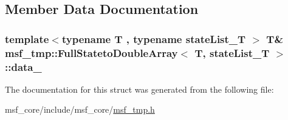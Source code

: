 \subsection{Member Data Documentation}
\hypertarget{structmsf__tmp_1_1FullStatetoDoubleArray_a6fc51890393603ad774e5dde66389be0}{
\subsubsection[{data\-\_\-}]{\setlength{\rightskip}{0pt plus 5cm}template$<$typename T , typename state\-List\-\_\-\-T $>$ T\& {\bf msf\-\_\-tmp\-::\-Full\-Stateto\-Double\-Array}$<$ T, state\-List\-\_\-\-T $>$\-::data\-\_\-\hspace{0.3cm}{\ttfamily [private]}}}\label{structmsf__tmp_1_1FullStatetoDoubleArray_a6fc51890393603ad774e5dde66389be0}


The documentation for this struct was generated from the following file\-:\begin{DoxyCompactItemize}
\item 
msf\-\_\-core/include/msf\-\_\-core/\hyperlink{msf__tmp_8h}{msf\-\_\-tmp.\-h}\end{DoxyCompactItemize}

